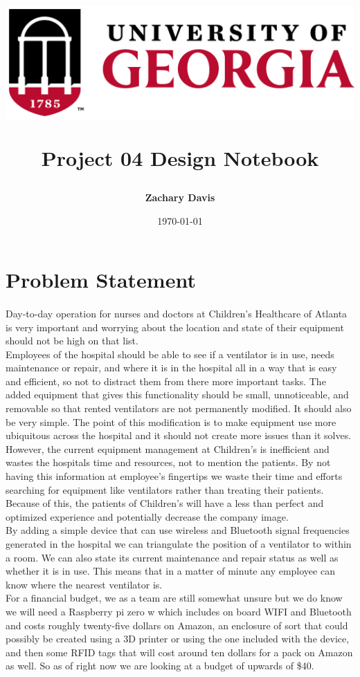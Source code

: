 \documentclass[12pt]{article}
\title{
	\begin{center}
		\includegraphics[scale=0.5]{uga.png}\\
 	\end{center}
 	Project 04
	\bigbreak Design Notebook
}
\author{\textbf{Zachary Davis}}
\date{\today}
\newcommand\tab[1][1cm]{\hspace*{#1}}
\begin{document}
	
	\vspace{\fill}
	\maketitle
	\vspace{\fill}

	\newpage
	\tableofcontents
	\newpage

\section{Problem Statement}
	\paragraph*{}
		Day-to-day operation for nurses and doctors at Children’s Healthcare of Atlanta is very
		important and worrying about the location and state of their equipment should not be high on that list.\\
		\tab Employees of the hospital should be able to see if a ventilator is in use, needs maintenance or repair, and where it is in the hospital all in a way that is easy and efficient, so not to distract them from there more important tasks. The added equipment that gives this functionality should be small, unnoticeable, and removable so that rented ventilators are not permanently modified. It should also be very simple. The point of this modification is to make equipment use more ubiquitous across the hospital and it should not create more issues than it solves.\\
		\tab However, the current equipment management at Children’s is inefficient and wastes the hospitals time and resources, not to mention the patients. By not having this information at employee’s fingertips we waste their time and efforts searching for equipment like ventilators rather than treating their patients. Because of this, the patients of Children’s will have a less than perfect and optimized experience and potentially decrease the company image.\\
		\tab By adding a simple device that can use wireless and Bluetooth signal frequencies generated in the hospital we can triangulate the position of a ventilator to within a room. We can also state its current maintenance and repair status as well as whether it is in use. This means that in a matter of minute any employee can know where the nearest ventilator is.\\
		\tab For a financial budget, we as a team are still somewhat unsure but we do know we will need a Raspberry pi zero w which includes on board WIFI and Bluetooth and costs roughly twenty-five dollars on Amazon, an enclosure of sort that could possibly be created using a 3D printer or using the one included with the device, and then some RFID tags that will cost around ten dollars for a pack on Amazon as well. So as of right now we are looking at a budget of upwards of \$40.
		
\end{document}
